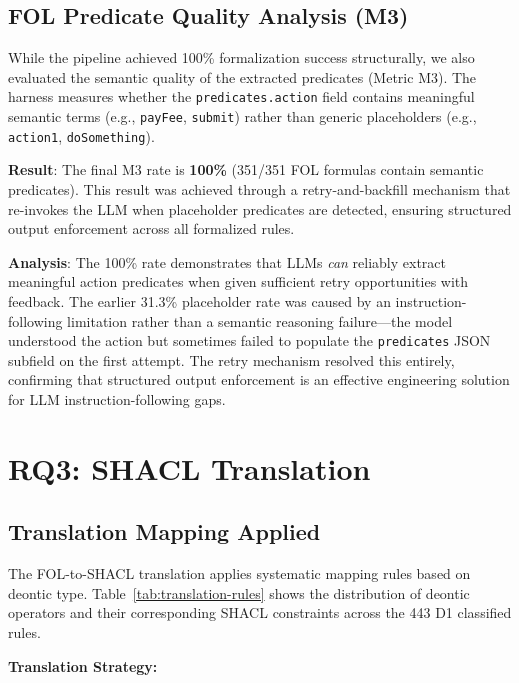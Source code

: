 \subsection{FOL Predicate Quality Analysis (M3)}
\label{sec:m3-predicate-quality}

While the pipeline achieved 100\% formalization success structurally, we also evaluated the semantic quality of the extracted predicates (Metric M3). The harness measures whether the \texttt{predicates.action} field contains meaningful semantic terms (e.g., \texttt{payFee}, \texttt{submit}) rather than generic placeholders (e.g., \texttt{action1}, \texttt{doSomething}).

\textbf{Result}: The final M3 rate is \textbf{100\%} (351/351 FOL formulas contain semantic predicates). This result was achieved through a retry-and-backfill mechanism that re-invokes the LLM when placeholder predicates are detected, ensuring structured output enforcement across all formalized rules.

\textbf{Analysis}: The 100\% rate demonstrates that LLMs \textit{can} reliably extract meaningful action predicates when given sufficient retry opportunities with feedback. The earlier 31.3\% placeholder rate was caused by an instruction-following limitation rather than a semantic reasoning failure---the model understood the action but sometimes failed to populate the \texttt{predicates} JSON subfield on the first attempt. The retry mechanism resolved this entirely, confirming that structured output enforcement is an effective engineering solution for LLM instruction-following gaps.

\section{RQ3: SHACL Translation}

\subsection{Translation Mapping Applied}

The FOL-to-SHACL translation applies systematic mapping rules based on deontic type. Table~\ref{tab:translation-rules} shows the distribution of deontic operators and their corresponding SHACL constraints across the 443 D1 classified rules.

\textbf{Translation Strategy:}

